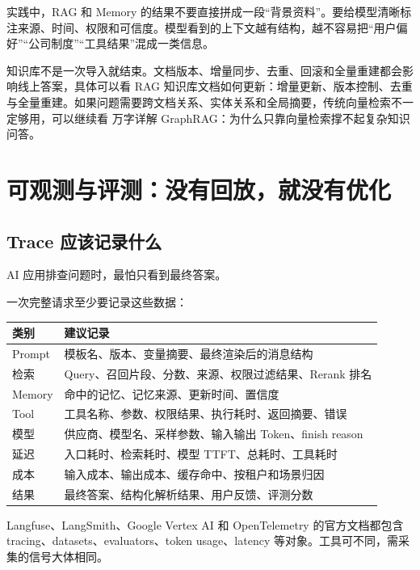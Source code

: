 \documentclass[9pt,a4paper,twocolumn]{ctexart}
\begin{document}
实践中，RAG 和 Memory 的结果不要直接拼成一段“背景资料”。要给模型清晰标注来源、时间、权限和可信度。模型看到的上下文越有结构，越不容易把“用户偏好”“公司制度”“工具结果”混成一类信息。



知识库不是一次导入就结束。文档版本、增量同步、去重、回滚和全量重建都会影响线上答案，具体可以看 RAG 知识库文档如何更新：增量更新、版本控制、去重与全量重建。如果问题需要跨文档关系、实体关系和全局摘要，传统向量检索不一定够用，可以继续看 万字详解 GraphRAG：为什么只靠向量检索撑不起复杂知识问答。



\section*{可观测与评测：没有回放，就没有优化}


\subsection*{Trace 应该记录什么}


AI 应用排查问题时，最怕只看到最终答案。



一次完整请求至少要记录这些数据：


{\footnotesize
\begin{tabular}{|p{}|p{}|}
\hline
\textbf{类别} & \textbf{建议记录} \\
\hline
Prompt & 模板名、版本、变量摘要、最终渲染后的消息结构 \\
\hline
检索 & Query、召回片段、分数、来源、权限过滤结果、Rerank 排名 \\
\hline
Memory & 命中的记忆、记忆来源、更新时间、置信度 \\
\hline
Tool & 工具名称、参数、权限结果、执行耗时、返回摘要、错误 \\
\hline
模型 & 供应商、模型名、采样参数、输入输出 Token、finish reason \\
\hline
延迟 & 入口耗时、检索耗时、模型 TTFT、总耗时、工具耗时 \\
\hline
成本 & 输入成本、输出成本、缓存命中、按租户和场景归因 \\
\hline
结果 & 最终答案、结构化解析结果、用户反馈、评测分数 \\
\hline
\end{tabular}
}



Langfuse、LangSmith、Google Vertex AI 和 OpenTelemetry 的官方文档都包含 tracing、datasets、evaluators、token usage、latency 等对象。工具可不同，需采集的信号大体相同。
\end{document}

